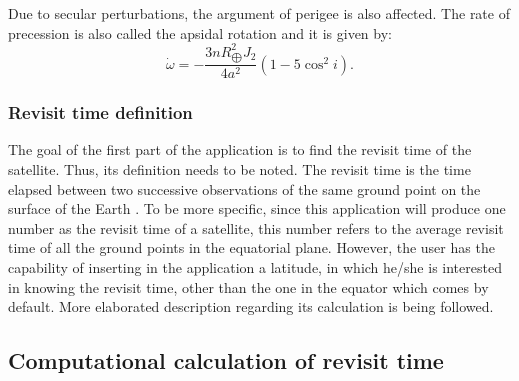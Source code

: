 Due to secular perturbations, the argument of perigee is also affected. The rate of precession is also called the apsidal rotation and it is given by:
\begin{equation}
\dot{\omega} = - \frac{3 n R_{\bigoplus}^{2} J_{2}}{4 a^{2}} (1 - 5 \cos^{2}{i}).
\end{equation}


\bigskip
\subsubsection{Revisit time definition}
\bigskip

The goal of the first part of the application is to find the revisit time of the satellite. Thus, its definition needs to be noted. The revisit time is the time elapsed between two successive observations of the same ground point on the surface of the Earth \cite{Luo}. To be more specific, since this application will produce one number as the revisit time of a satellite, this number refers to the average revisit time of all the ground points in the equatorial plane. However, the user has the capability of inserting in the application a latitude, in which he/she is interested in knowing the revisit time, other than the one in the equator which comes by default. More elaborated description regarding its calculation is being followed.


\bigskip
\subsection{Computational calculation of revisit time}
\label{how_to}
\bigskip

